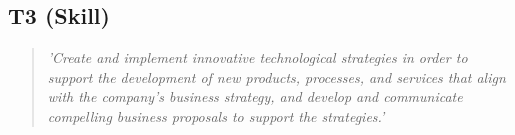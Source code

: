 \subsection*{T3 (Skill)}

  \begin{quote}
    \textit{'Create and implement innovative technological
    strategies in order to support the development of new
    products, processes, and services that align with the
    company’s business strategy, and develop and
    communicate compelling business proposals to support
    the strategies.'}
  \end{quote}

\newpage